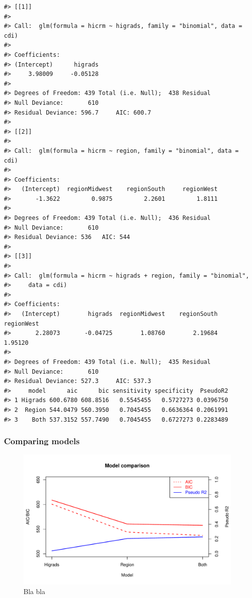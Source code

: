 \documentclass[a4paper]{article}
\begin{document}
\begin{verbatim}
#> [[1]]
#> 
#> Call:  glm(formula = hicrm ~ higrads, family = "binomial", data = cdi)
#> 
#> Coefficients:
#> (Intercept)      higrads  
#>     3.98009     -0.05128  
#> 
#> Degrees of Freedom: 439 Total (i.e. Null);  438 Residual
#> Null Deviance:       610 
#> Residual Deviance: 596.7     AIC: 600.7
#> 
#> [[2]]
#> 
#> Call:  glm(formula = hicrm ~ region, family = "binomial", data = cdi)
#> 
#> Coefficients:
#>   (Intercept)  regionMidwest    regionSouth     regionWest  
#>       -1.3622         0.9875         2.2601         1.8111  
#> 
#> Degrees of Freedom: 439 Total (i.e. Null);  436 Residual
#> Null Deviance:       610 
#> Residual Deviance: 536   AIC: 544
#> 
#> [[3]]
#> 
#> Call:  glm(formula = hicrm ~ higrads + region, family = "binomial", 
#>     data = cdi)
#> 
#> Coefficients:
#>   (Intercept)        higrads  regionMidwest    regionSouth     regionWest  
#>       2.28073       -0.04725        1.08760        2.19684        1.95120  
#> 
#> Degrees of Freedom: 439 Total (i.e. Null);  435 Residual
#> Null Deviance:       610 
#> Residual Deviance: 527.3     AIC: 537.3
#>     model      aic      bic sensitivity specificity  PseudoR2
#> 1 Higrads 600.6780 608.8516   0.5545455   0.5727273 0.0396750
#> 2  Region 544.0479 560.3950   0.7045455   0.6636364 0.2061991
#> 3    Both 537.3152 557.7490   0.7045455   0.6727273 0.2283489
\end{verbatim}

\subsubsection{Comparing models}\label{comparing-models}

\begin{figure}[h]
\includegraphics{Project_2_files/figure-latex/unnamed-chunk-2-1} \caption{Bla bla}\label{fig:unnamed-chunk-2}
\end{figure}
\end{document}
